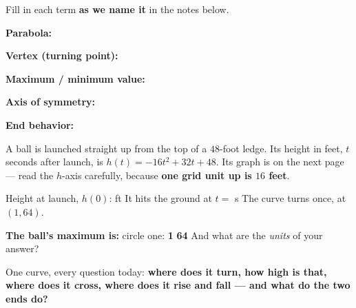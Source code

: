 \documentclass[12pt]{article}
\newcommand{\vrowheight}{2.0cm}
\newcommand{\vterm}[1]{%
  \par\noindent\begin{minipage}[t][\vrowheight][t]{\linewidth}%
    \vspace*{6pt}\textbf{\textcolor{forest}{#1:}}%
  \end{minipage}\par}
\begin{document}

\vspace{4pt}

\boxguard[12]
\begin{vocabbox}
\small
Fill in each term \textbf{as we name it} in the notes below.
\vterm{Parabola}
\vterm{Vertex (turning point)}
\vterm{Maximum / minimum value}
\vterm{Axis of symmetry}
\vterm{End behavior}
\end{vocabbox}

\vspace{6pt}

\boxguard[12]
\begin{hookbox}
\small
A ball is launched straight up from the top of a $48$-foot ledge. Its height in feet, $t$ seconds
after launch, is $h(t)=-16t^2+32t+48$. Its graph is on the next page --- read the $h$-axis
carefully, because \textbf{one grid unit up is $16$ feet}.
\par\vspace{4pt}
Height at launch, $h(0)$: \blank{1.2cm} ft \quad It hits the ground at $t=$ \blank{1.0cm} s \quad
The curve turns once, at $(1,64)$.
\par\vspace{5pt}
\textbf{The ball's maximum is:} circle one: \quad \textbf{1} \qquad \textbf{64} \qquad
And what are the \emph{units} of your answer? \blank{4.0cm}
\par\vspace{4pt}
One curve, every question today: \textbf{where does it turn, how high is that, where does it
cross, where does it rise and fall --- and what do the two ends do?}
\end{hookbox}
\end{document}
